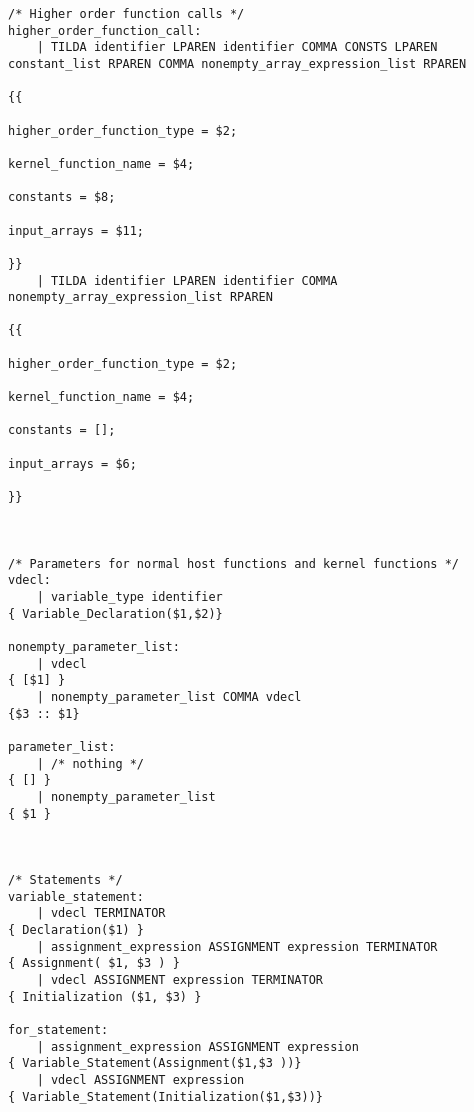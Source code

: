 \begin{verbatim}
/* Higher order function calls */
higher_order_function_call:
    | TILDA identifier LPAREN identifier COMMA CONSTS LPAREN constant_list RPAREN COMMA nonempty_array_expression_list RPAREN
                                                                        {{
                                                                            higher_order_function_type = $2;
                                                                            kernel_function_name = $4;
                                                                            constants = $8;
                                                                            input_arrays = $11;
                                                                        }}
    | TILDA identifier LPAREN identifier COMMA nonempty_array_expression_list RPAREN
                                                                        {{
                                                                            higher_order_function_type = $2;
                                                                            kernel_function_name = $4;
                                                                            constants = [];
                                                                            input_arrays = $6;
                                                                        }}



/* Parameters for normal host functions and kernel functions */
vdecl:
    | variable_type identifier                                          { Variable_Declaration($1,$2)}

nonempty_parameter_list:
    | vdecl                                                             { [$1] }
    | nonempty_parameter_list COMMA vdecl                               {$3 :: $1}

parameter_list:
    | /* nothing */                                                     { [] }
    | nonempty_parameter_list                                           { $1 }



/* Statements */ 
variable_statement:
    | vdecl TERMINATOR                                                  { Declaration($1) }
    | assignment_expression ASSIGNMENT expression TERMINATOR            { Assignment( $1, $3 ) }
    | vdecl ASSIGNMENT expression TERMINATOR                            { Initialization ($1, $3) }

for_statement:
    | assignment_expression ASSIGNMENT expression                       { Variable_Statement(Assignment($1,$3 ))}
    | vdecl ASSIGNMENT expression                                       { Variable_Statement(Initialization($1,$3))}
    

\end{verbatim}
